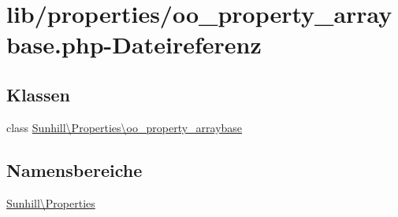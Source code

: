 \hypertarget{oo__property__arraybase_8php}{}\section{lib/properties/oo\+\_\+property\+\_\+arraybase.php-\/\+Dateireferenz}
\label{oo__property__arraybase_8php}
\subsection*{Klassen}
\begin{DoxyCompactItemize}
\item 
class \hyperlink{classSunhill_1_1Properties_1_1oo__property__arraybase}{Sunhill\textbackslash{}\+Properties\textbackslash{}oo\+\_\+property\+\_\+arraybase}
\end{DoxyCompactItemize}
\subsection*{Namensbereiche}
\begin{DoxyCompactItemize}
\item 
 \hyperlink{namespaceSunhill_1_1Properties}{Sunhill\textbackslash{}\+Properties}
\end{DoxyCompactItemize}
